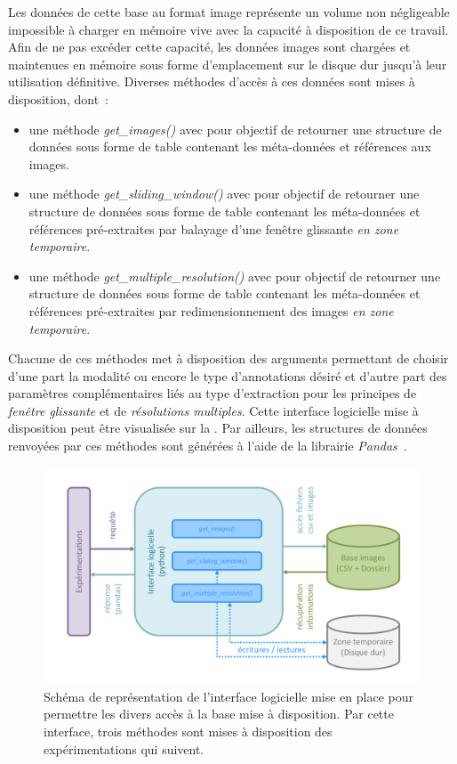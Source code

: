 Les données de cette base au format image représente un volume non négligeable impossible à charger en mémoire vive avec la capacité à disposition de ce travail. Afin de ne pas excéder cette capacité, les données images sont chargées et maintenues en mémoire sous forme d'emplacement sur le disque dur jusqu'à leur utilisation définitive. Diverses méthodes d'accès à ces données sont mises à disposition, dont~:
\begin{itemize}
    \item une méthode \textit{get\_images()} avec pour objectif de retourner une structure de données sous forme de table contenant les méta-données et références aux images.
    \item une méthode \textit{get\_sliding\_window()} avec pour objectif de retourner une structure de données sous forme de table contenant les méta-données et références pré-extraites par balayage d'une fenêtre glissante \textit{en zone temporaire}.
    \item une méthode \textit{get\_multiple\_resolution()} avec pour objectif de retourner une structure de données sous forme de table contenant les méta-données et références pré-extraites par redimensionnement des images  \textit{en zone temporaire}.
\end{itemize} Chacune de ces méthodes met à disposition des arguments permettant de choisir d'une part la modalité ou encore le type d'annotations désiré et d'autre part des paramètres complémentaires liés au type d'extraction pour les principes de \textit{fenêtre glissante} et de \textit{résolutions multiples}. Cette interface logicielle mise à disposition peut être visualisée sur la . Par ailleurs, les structures de données renvoyées par ces méthodes sont générées à l'aide de la librairie \textit{Pandas}~\cite{Pandas2020}.\par 

\begin{figure}[H]
    \centering
    \includegraphics[width=\linewidth]{contents/chapter_4/resources/schema_database_api.pdf}
    \caption{Schéma de représentation de l'interface logicielle mise en place pour permettre les divers accès à la base mise à disposition. Par cette interface, trois méthodes sont mises à disposition des expérimentations qui suivent.}
    \label{fig:schema_database_api}
\end{figure}\par
\clearpage

